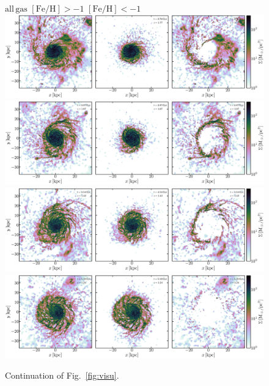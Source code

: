 \documentclass[useAMS,usenatbib]{mnras}
\begin{document}
\begin{figure}
    \begin{centering}
    \hspace*{.5em} $\mathrm{all\, gas}$ \hspace*{12.5em} $\mathrm{[Fe/H]}>-1$ \hspace*{12.em} $\mathrm{[Fe/H]}<-1$ 
     \includegraphics[width=.99\linewidth]{static/frame0054.pdf}
     \includegraphics[width=.99\linewidth]{static/frame0058.pdf}
     \includegraphics[width=.99\linewidth]{static/frame0068.pdf}
     \includegraphics[width=.99\linewidth]{static/frame0078.pdf}
     \vspace*{-1.em}
     \caption{
     Continuation of Fig.~\ref{fig:visu}.      
     }
     \label{fig:visu2}
    \end{centering}
\end{figure}
\end{document}
